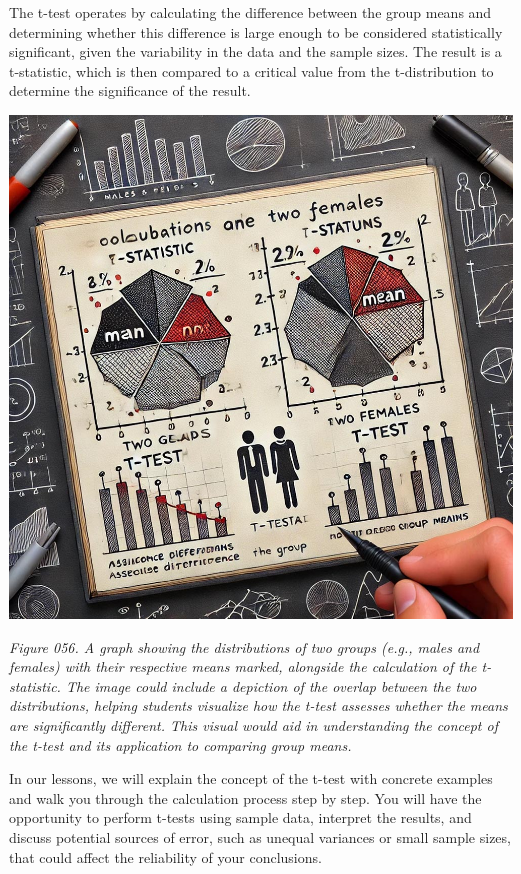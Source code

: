\documentclass[
]{book}
\begin{document}
The t-test operates by calculating the difference between the group means and determining whether this difference is large enough to be considered statistically significant, given the variability in the data and the sample sizes. The result is a t-statistic, which is then compared to a critical value from the t-distribution to determine the significance of the result.

\includegraphics[width=1\textwidth,height=\textheight]{images/fig056.jpg}

\emph{Figure 056. A graph showing the distributions of two groups (e.g., males and females) with their respective means marked, alongside the calculation of the t-statistic. The image could include a depiction of the overlap between the two distributions, helping students visualize how the t-test assesses whether the means are significantly different. This visual would aid in understanding the concept of the t-test and its application to comparing group means.}

In our lessons, we will explain the concept of the t-test with concrete examples and walk you through the calculation process step by step. You will have the opportunity to perform t-tests using sample data, interpret the results, and discuss potential sources of error, such as unequal variances or small sample sizes, that could affect the reliability of your conclusions.
\end{document}
